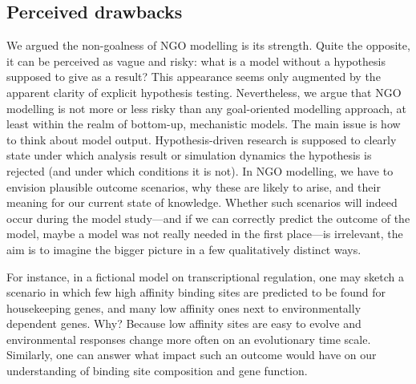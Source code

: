 \subsection{Perceived drawbacks}

We argued the non-goalness of NGO modelling is its strength. Quite the opposite, it can be perceived as vague and risky: what is a model without a hypothesis supposed to give as a result? This appearance seems only augmented by the apparent clarity of explicit hypothesis testing. Nevertheless, we argue that NGO modelling is not more or less risky than any goal-oriented modelling approach, at least within the realm of bottom-up, mechanistic models. The main issue is how to think about model output. Hypothesis-driven research is supposed to clearly state under which analysis result or simulation dynamics the hypothesis is rejected (and under which conditions it is not). In NGO modelling, we have to envision plausible outcome scenarios, why these are likely to arise, and their meaning for our current state of knowledge. Whether such scenarios will indeed occur during the model study---and if we can correctly predict the outcome of the model, maybe a model was not really needed in the first place---is irrelevant, the aim is to imagine the bigger picture in a few qualitatively distinct ways.

For instance, in a fictional model on transcriptional regulation, one may sketch a scenario in which few high affinity binding sites are predicted to be found for housekeeping genes, and many low affinity ones next to environmentally dependent genes. Why? Because low affinity sites are easy to evolve and environmental responses change more often on an evolutionary time scale. Similarly, one can answer what impact such an outcome would have on our understanding of binding site composition and gene function.